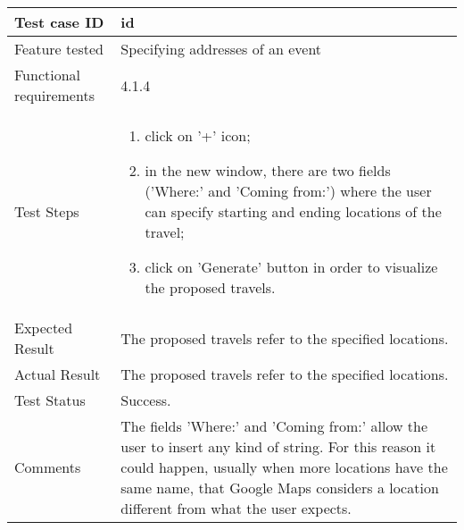 \begin{table}[H]
	\begin{center}
		\begin{tabular}{ | p{} | p{} | }
		\hline
		Test case ID & id\\
		\hline
		Feature tested & Specifying addresses of an event\\
		\hline
		Functional requirements & 4.1.4 \\
    	\hline
		Test Steps & 
			\begin{enumerate}
				\item click on '+' icon;
				\item in the new window, there are two fields ('Where:' and 'Coming from:') where the user can specify starting and ending locations of the travel;
				\item click on 'Generate' button in order to visualize the proposed travels.
			\end{enumerate} \\
		\hline
		Expected Result & The proposed travels refer to the specified locations.\\
		\hline
		Actual Result & The proposed travels refer to the specified locations.\\ 
		\hline
		Test Status & \color{ForestGreen}Success.\\ 
		\hline
		Comments & The fields 'Where:' and 'Coming from:' allow the user to insert any kind of string. For this reason it could happen, usually when more locations have the same name, that Google Maps considers a location different from what the user expects. \\ 
		\hline
		
		\end{tabular}
	\end{center}
\end{table}

